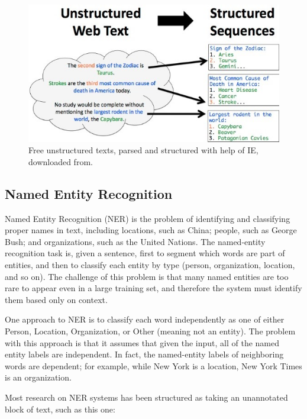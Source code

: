 \documentclass[thesis=M,english]{FITthesis}[2018/05/30]
\begin{document}
	\begin{figure}[H]\centering
		\includegraphics[width=\textwidth]{information-extraction}
		\caption[Information extraction example]{Free unstructured texts, parsed and structured with help of IE, downloaded from\footnotemark \label{fig:InformationExtraction}.}
	\end{figure}


\subsection{Named Entity Recognition}\label{NER subsection}
Named Entity Recognition (NER) \cite{article:NER} is the problem of identifying and classifying proper names in text, including locations, such as China; people, such as George Bush; and organizations, such as the United Nations. The named-entity recognition task is, given a sentence, first to segment which words are part of entities, and then to classify each entity by type (person, organization, location, and so on). The challenge of this problem is that many named entities are too rare to appear even in a large training set, and therefore the system must identify them based only on context.

One approach to NER is to classify each word independently as one of either Person, Location, Organization, or Other (meaning not an entity). The problem with this approach is that it assumes that given the input, all of the named entity labels are independent. In fact, the named-entity labels of neighboring words are dependent; for example, while New York is a location, New York Times is an organization.


Most research on NER systems has been structured as taking an unannotated block of text, such as this one:
\end{document}
